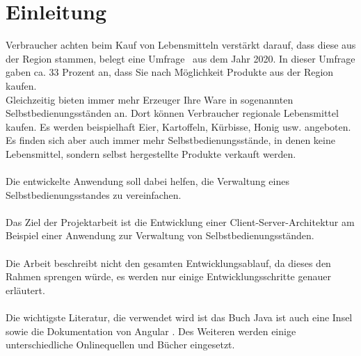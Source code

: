 \section{Einleitung}\label{einleitung}
Verbraucher achten beim Kauf von Lebensmitteln verstärkt darauf, dass diese aus der Region stammen, belegt eine Umfrage~\cite{umfrage2} aus dem Jahr 2020. In dieser Umfrage gaben ca. 33 Prozent an, dass Sie nach Möglichkeit Produkte aus der Region kaufen.
\\
Gleichzeitig bieten immer mehr Erzeuger Ihre Ware in sogenannten Selbstbedienungsständen an. Dort können Verbraucher regionale Lebensmittel kaufen. Es werden beispielhaft Eier, Kartoffeln, Kürbisse, Honig usw. angeboten. Es finden sich aber auch immer mehr Selbstbedienungsstände, in denen keine Lebensmittel, sondern selbst hergestellte Produkte verkauft werden.
\\
\\
Die entwickelte Anwendung soll dabei helfen, die Verwaltung eines Selbstbedienungsstandes zu vereinfachen.
\\
\\
Das Ziel der Projektarbeit ist die Entwicklung einer Client-Server-Architektur am Beispiel einer Anwendung zur Verwaltung von Selbstbedienungsständen.
\\
\\
Die Arbeit beschreibt nicht den gesamten Entwicklungsablauf, da dieses den Rahmen sprengen würde, es werden nur einige Entwicklungsschritte genauer erläutert.  
\\
\\
Die wichtigste Literatur, die verwendet wird ist das Buch \glqq Java ist auch eine Insel\grqq{} \cite{Insel} sowie die Dokumentation von Angular \cite{Ang}. Des Weiteren werden einige unterschiedliche Onlinequellen und Bücher eingesetzt.
